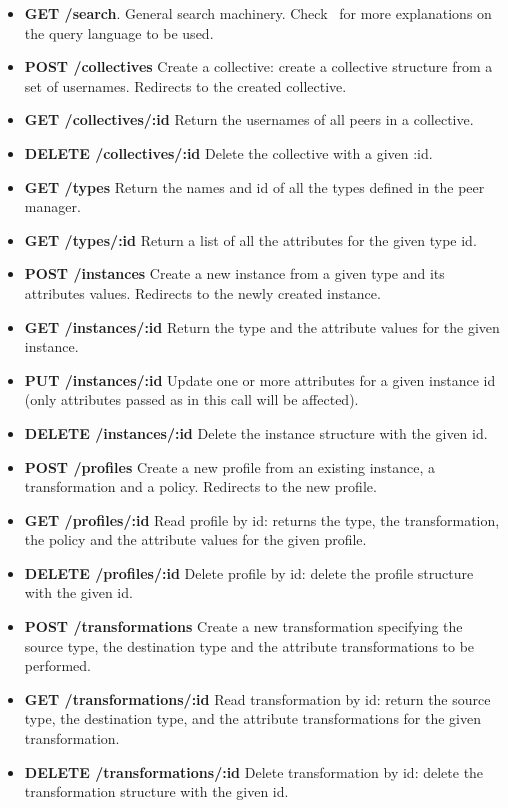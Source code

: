 \begin{itemize}
\item {\bf GET /search}. General search machinery. Check~\cite{D4.3} for more explanations on the query language to be used. 	
\item {\bf POST /collectives} Create a collective: create a collective structure from a set of usernames. Redirects to the created collective.
\item {\bf GET /collectives/:id}	Return the usernames of all peers in a collective.				
\item {\bf DELETE /collectives/:id} Delete the collective with a given :id.	
\item {\bf GET /types} Return the names and id of all the types defined in the peer manager.
\item {\bf GET /types/:id} Return a list of all the attributes for the given type id.
\item {\bf POST /instances} Create a new instance from a given type and its attributes values. Redirects to the newly created instance.
\item {\bf GET /instances/:id} Return the type and the attribute values for the given instance.
\item {\bf PUT /instances/:id} Update one or more attributes for a given instance id (only attributes passed as in this call will be affected).											
\item {\bf DELETE /instances/:id } Delete the instance structure with the given id.						
\item {\bf POST /profiles} Create a new profile from an existing instance, a transformation and a policy. Redirects to the new profile.
\item {\bf GET /profiles/:id} Read profile by id: returns the type, the transformation, the policy and the attribute values for the given profile. 
\item {\bf DELETE /profiles/:id} Delete profile by id: delete the profile structure with the given id.	
\item {\bf POST /transformations}  Create a new transformation specifying the source type, the destination type and the attribute transformations to be performed.
\item {\bf GET /transformations/:id} Read transformation by id: return the source type, the destination type, and the attribute transformations for the given transformation.									
\item {\bf DELETE /transformations/:id} Delete transformation by id: delete the transformation structure with the given id.	

\end{itemize}
